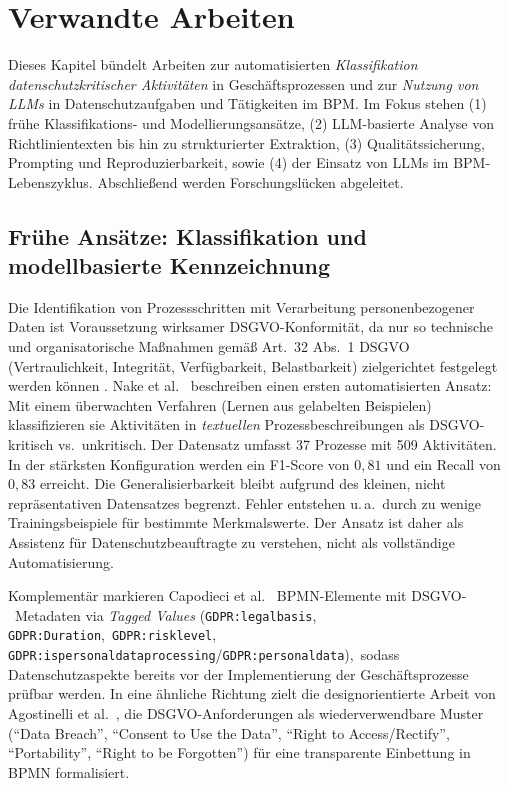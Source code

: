 \section{Verwandte Arbeiten}\label{sec:verwandte-arbeiten}

Dieses Kapitel bündelt Arbeiten zur automatisierten \emph{Klassifikation datenschutzkritischer Aktivitäten} in Geschäftsprozessen und zur \emph{Nutzung von \acp{LLM}} in Datenschutzaufgaben und Tätigkeiten im \ac{BPM}. Im Fokus stehen (1) frühe Klassifikations- und Modellierungsansätze, (2) \ac{LLM}-basierte Analyse von Richtlinientexten bis hin zu strukturierter Extraktion, (3) Qualitätssicherung, Prompting und Reproduzierbarkeit, sowie (4) der Einsatz von \acp{LLM} im \ac{BPM}-Lebenszyklus. Abschließend werden Forschungslücken abgeleitet.

\subsection*{Frühe Ansätze: Klassifikation und modellbasierte Kennzeichnung}

Die Identifikation von Prozessschritten mit Verarbeitung personenbezogener Daten ist Voraussetzung wirksamer \ac{DSGVO}-Konformität, da nur so technische und organisatorische Maßnahmen gemäß Art.~32 Abs.~1 \ac{DSGVO} (Vertraulichkeit, Integrität, Verfügbarkeit, Belastbarkeit) zielgerichtet festgelegt werden können \cite{GDPR2016}. Nake et al.\ \cite{nake2023towards} beschreiben einen ersten automatisierten Ansatz: Mit einem überwachten Verfahren (Lernen aus gelabelten Beispielen) klassifizieren sie Aktivitäten in \emph{textuellen} Prozessbeschreibungen als \ac{DSGVO}-kritisch vs.\ unkritisch. Der Datensatz umfasst 37 Prozesse mit 509 Aktivitäten. In der stärksten Konfiguration werden ein F1-Score von $0{,}81$ und ein Recall von $0{,}83$ erreicht. Die Generalisierbarkeit bleibt aufgrund des kleinen, nicht repräsentativen Datensatzes begrenzt. Fehler entstehen u.\,a.\ durch zu wenige Trainingsbeispiele für bestimmte Merkmalswerte. Der Ansatz ist daher als Assistenz für Datenschutzbeauftragte zu verstehen, nicht als vollständige Automatisierung.

Komplementär markieren Capodieci et al.\ \cite{Capodieci2023BPMNEnabledDP} \ac{BPMN}-Elemente mit \ac{DSGVO}-\linebreak~Metadaten via \emph{Tagged Values} (\texttt{GDPR:legalbasis}, \texttt{GDPR:Duration},\linebreak~\texttt{GDPR:risklevel}, \texttt{GDPR:ispersonaldataprocessing}/\texttt{GDPR:personaldata}),\linebreak~sodass Datenschutzaspekte bereits vor der Implementierung der Geschäftsprozesse prüfbar werden. In eine ähnliche Richtung zielt die designorientierte Arbeit von Agostinelli et al.\ \cite{agostinelli2019achievingGDPRComliance}, die \ac{DSGVO}-Anforderungen als wiederverwendbare Muster (\enquote{Data Breach}, \enquote{Consent to Use the Data}, \enquote{Right to Access/Rectify}, \enquote{Portability}, \enquote{Right to be Forgotten}) für eine transparente Einbettung in \ac{BPMN} formalisiert.

